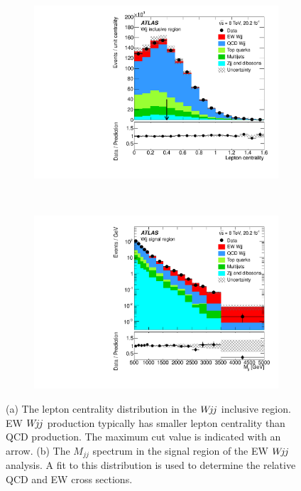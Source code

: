 \documentclass{PoS}
\def\wjj{\ensuremath{W\kern -0.2em j\kern -0.1emj}\xspace}
\def\mjj{\ensuremath{M_{jj}}\xspace}
\begin{document}
\begin{figure}
  \centering
  \begin{subfigure}[t]{0.50\textwidth}
    \centering
    \includegraphics[width=.99\textwidth]{STDM-2014-11/fig_05b.pdf}\vspace{-6mm}
    \caption{}
  \end{subfigure}%
  ~
  \begin{subfigure}[t]{0.50\textwidth}
    \centering
    \includegraphics[width=.99\textwidth]{STDM-2014-11/fig_09b.pdf}\vspace{-6mm}
    \caption{}
  \end{subfigure}%
  \caption{(a) The lepton centrality distribution in the \wjj inclusive region. EW \wjj production
typically has smaller lepton centrality than QCD production. The maximum cut value is indicated with an
arrow. (b) The \mjj spectrum in the signal region
of the EW \wjj analysis. A fit to this distribution is used to determine the relative QCD and EW cross
sections.
}
  \label{wjj-variables}
\end{figure}
\end{document}

